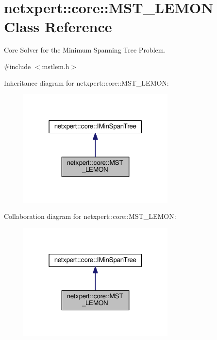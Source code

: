\hypertarget{classnetxpert_1_1core_1_1MST__LEMON}{}\section{netxpert\+:\+:core\+:\+:M\+S\+T\+\_\+\+L\+E\+M\+ON Class Reference}
\label{classnetxpert_1_1core_1_1MST__LEMON}


Core Solver for the Minimum Spanning Tree Problem.  




{\ttfamily \#include $<$mstlem.\+h$>$}



Inheritance diagram for netxpert\+:\+:core\+:\+:M\+S\+T\+\_\+\+L\+E\+M\+ON\+:\nopagebreak
\begin{figure}[H]
\begin{center}
\leavevmode
\includegraphics[width=223pt]{classnetxpert_1_1core_1_1MST__LEMON__inherit__graph}
\end{center}
\end{figure}


Collaboration diagram for netxpert\+:\+:core\+:\+:M\+S\+T\+\_\+\+L\+E\+M\+ON\+:\nopagebreak
\begin{figure}[H]
\begin{center}
\leavevmode
\includegraphics[width=223pt]{classnetxpert_1_1core_1_1MST__LEMON__coll__graph}
\end{center}
\end{figure}
